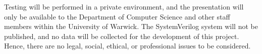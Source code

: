 Testing will be performed in a private environment, and the presentation will only be available to the Department of Computer Science and other staff members within the University of Warwick. The SystemVerilog system will not be published, and no data will be collected for the development of this project. Hence, there are no legal, social, ethical, or professional issues to be considered. 
